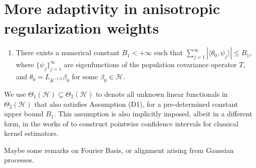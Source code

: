 \documentclass[11pt,a4paper]{article}
\theoremstyle{definition}
\theoremstyle{plain}
\theoremstyle{remark}
\newcommand{\mH}{\mathcal H}
\begin{document}

\section{More adaptivity in anisotropic regularization weights}\label{sec:adptr}

\begin{enumerate}
\item[(C1)] There exists a numerical constant $B_1<+\infty$ such that $\sum_{j=1}^{\infty}|\langle \theta_0, \psi_j\rangle| \leq B_1$, where $\{\psi_j\}_{j=1}^{\infty}$ are eigenfunctions of the population covariance operator $T$,
and $\theta_0=L_{K^{-1/2}}\beta_0$ for some $\beta_0\in\mH$.
\end{enumerate}
We use $\Theta_1(\mH)\subseteq\Theta_2(\mH)$ to denote all unknown linear functionals in $\Theta_2(\mH)$ that also satisfies Assumption (D1), for a pre-determined constant upper bound $B_1$.
This assumption is also implicitly imposed, albeit in a different form, in the works of \cite{liu2025scalable} to construct pointwise confidence intervals for classical kernel estimators.

{\color{red}Maybe some remarks on Fourier Basis, or alignment arising from Gaussian processes.}
\end{document}
